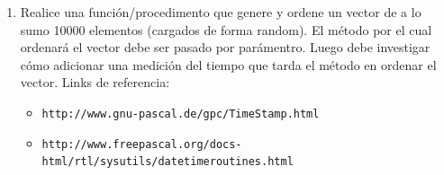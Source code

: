\documentclass[a4paper,10pt]{article}
\begin{document}
\begin{enumerate}
\item Realice una funci\'on/procedimento que genere y ordene un vector de a lo sumo 10000 elementos (cargados de forma random). El m\'etodo por el cual ordenar\'a el vector debe ser pasado por par\'amentro. Luego debe investigar c\'omo adicionar una medici\'on del tiempo que tarda el m\'etodo en ordenar el vector. Links de referencia:
    \begin{itemize}
        \item[-] \verb#http://www.gnu-pascal.de/gpc/TimeStamp.html#
        \item[-] \verb#http://www.freepascal.org/docs-html/rtl/sysutils/datetimeroutines.html#
    \end{itemize} 



\end{enumerate}
\end{document}
